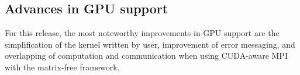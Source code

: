 \documentclass{ansarticle-preprint}
\newcommand{\specialword}[1]{\texttt{#1}}
\newcommand{\dealii}{{\specialword{deal.II}}\xspace}
\begin{document}


\subsection{Advances in GPU support}
\label{subsec:gpu}

For this release, the most noteworthy improvements in GPU support are the
simplification of the kernel written by user, improvement of error messaging,
and overlapping of computation and communication when using CUDA-aware MPI with
the matrix-free framework.
\end{document}

